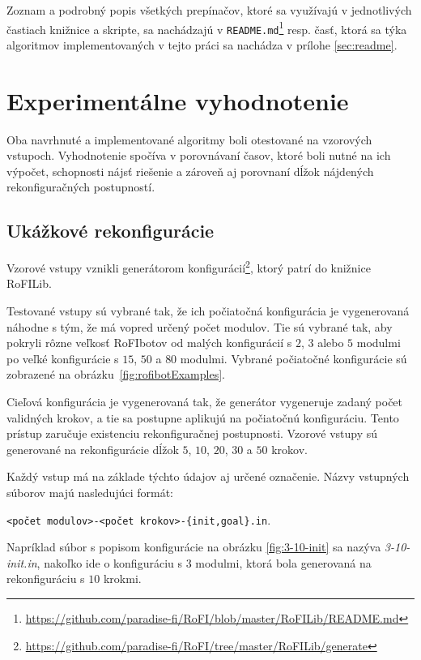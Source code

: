 \documentclass[
  digital, %
  oneside, %
  notable,   %
  lof,     %
  nolot,     %
]{fithesis3}
\begin{document}
Zoznam a podrobný popis všetkých prepínačov, ktoré sa využívajú v jednotlivých častiach knižnice a skripte, sa nachádzajú v \texttt{README.md}\footnote{\url{https://github.com/paradise-fi/RoFI/blob/master/RoFILib/README.md}} resp. časť, ktorá sa týka algoritmov implementovaných v tejto práci sa nachádza v prílohe \ref{sec:readme}. 





\chapter{Experimentálne vyhodnotenie}
Oba navrhnuté a implementované algoritmy boli otestované na vzorových vstupoch. Vyhodnotenie spočíva v porovnávaní časov, ktoré boli nutné na ich výpočet, schopnosti nájsť riešenie a zároveň aj porovnaní dĺžok nájdených rekonfiguračných postupností. 

\section{Ukážkové rekonfigurácie}
Vzorové vstupy vznikli generátorom konfigurácií\footnote{\url{https://github.com/paradise-fi/RoFI/tree/master/RoFILib/generate}}, ktorý patrí do knižnice RoFILib. 

Testované vstupy sú vybrané tak, že ich počiatočná konfigurácia je vygenerovaná náhodne s tým, že má vopred určený počet modulov. Tie sú vybrané tak, aby pokryli rôzne veľkosť RoFIbotov od malých konfigurácií s $2$, $3$ alebo $5$ modulmi po veľké konfigurácie s $15$, $50$ a $80$ modulmi. Vybrané počiatočné konfigurácie sú zobrazené na obrázku~\ref{fig:rofibotExamples}. 

Cieľová konfigurácia je vygenerovaná tak, že generátor vygeneruje zadaný počet validných krokov, a tie sa postupne aplikujú na počiatočnú konfiguráciu. Tento prístup zaručuje existenciu rekonfiguračnej postupnosti. Vzorové vstupy sú generované na rekonfigurácie dĺžok $5$, $10$, $20$, $30$ a $50$ krokov. 

Každý vstup má na základe týchto údajov aj určené označenie. Názvy vstupných súborov majú nasledujúci formát:

\texttt{<počet modulov>-<počet krokov>-\{init,goal\}.in}. 

Napríklad súbor s popisom konfigurácie na obrázku \ref{fig:3-10-init} sa nazýva \textit{3-10-init.in}, nakoľko ide o konfiguráciu s $3$ modulmi, ktorá bola generovaná na rekonfiguráciu s $10$ krokmi. 
\end{document}
